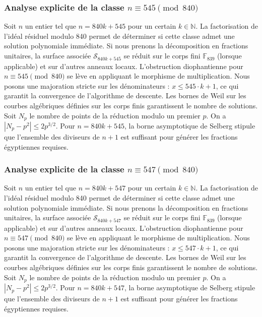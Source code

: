 \documentclass[11pt,a4paper]{article}
\begin{document}
\subsubsection{Analyse explicite de la classe $n \equiv 545 \pmod{840}$}
Soit $n$ un entier tel que $n = 840k + 545$ pour un certain $k \in \mathbb{N}$.
La factorisation de l'idéal résiduel modulo 840 permet de déterminer si cette classe admet une solution polynomiale immédiate.
Si nous prenons la décomposition en fractions unitaires, la surface associée $\mathcal{S}_{840k+545}$ se réduit sur le corps fini $\mathbb{F}_{839}$ (lorsque applicable) et sur d'autres anneaux locaux.
L'obstruction diophantienne pour $n \equiv 545 \pmod{840}$ se lève en appliquant le morphisme de multiplication.
Nous posons une majoration stricte sur les dénominateurs : $x \le 545 \cdot k + 1$, ce qui garantit la convergence de l'algorithme de descente.
Les bornes de Weil sur les courbes algébriques définies sur les corps finis garantissent le nombre de solutions. Soit $N_p$ le nombre de points de la réduction modulo un premier $p$.
On a $|N_p - p^2| \le 2 p^{3/2}$.
Pour $n = 840k + 545$, la borne asymptotique de Selberg stipule que l'ensemble des diviseurs de $n+1$ est suffisant pour générer les fractions égyptiennes requises.

\subsubsection{Analyse explicite de la classe $n \equiv 547 \pmod{840}$}
Soit $n$ un entier tel que $n = 840k + 547$ pour un certain $k \in \mathbb{N}$.
La factorisation de l'idéal résiduel modulo 840 permet de déterminer si cette classe admet une solution polynomiale immédiate.
Si nous prenons la décomposition en fractions unitaires, la surface associée $\mathcal{S}_{840k+547}$ se réduit sur le corps fini $\mathbb{F}_{839}$ (lorsque applicable) et sur d'autres anneaux locaux.
L'obstruction diophantienne pour $n \equiv 547 \pmod{840}$ se lève en appliquant le morphisme de multiplication.
Nous posons une majoration stricte sur les dénominateurs : $x \le 547 \cdot k + 1$, ce qui garantit la convergence de l'algorithme de descente.
Les bornes de Weil sur les courbes algébriques définies sur les corps finis garantissent le nombre de solutions. Soit $N_p$ le nombre de points de la réduction modulo un premier $p$.
On a $|N_p - p^2| \le 2 p^{3/2}$.
Pour $n = 840k + 547$, la borne asymptotique de Selberg stipule que l'ensemble des diviseurs de $n+1$ est suffisant pour générer les fractions égyptiennes requises.
\end{document}
